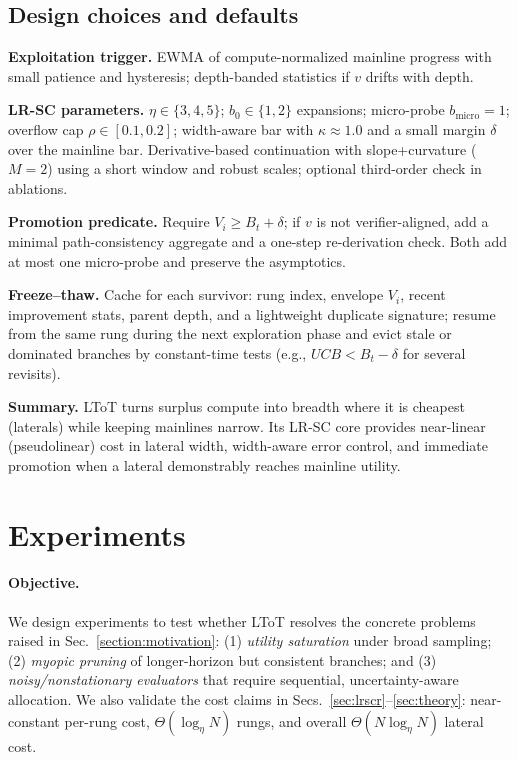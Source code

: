 \documentclass{article}
\begin{document}
\subsection{Design choices and defaults}
\label{sec:defaults}

\textbf{Exploitation trigger.}
EWMA of compute-normalized mainline progress with small patience and hysteresis; depth-banded statistics if $v$ drifts with depth.

\textbf{LR-SC parameters.}
$\eta\in\{3,4,5\}$; $b_0\in\{1,2\}$ expansions; micro-probe $b_{\text{micro}}=1$; overflow cap $\rho\in[0.1,0.2]$; width-aware bar with $\kappa\!\approx\!1.0$ and a small margin $\delta$ over the mainline bar.
Derivative-based continuation with slope+curvature ($M{=}2$) using a short window and robust scales; optional third-order check in ablations.

\textbf{Promotion predicate.}
Require $V_i \ge B_t + \delta$; if $v$ is not verifier-aligned, add a minimal path-consistency aggregate and a one-step re-derivation check.
Both add at most one micro-probe and preserve the asymptotics.

\textbf{Freeze--thaw.}
Cache for each survivor: rung index, envelope $V_i$, recent improvement stats, parent depth, and a lightweight duplicate signature; resume from the same rung during the next exploration phase and evict stale or dominated branches by constant-time tests (e.g., $UCB<B_t-\delta$ for several revisits).

\textbf{Summary.}
LToT turns surplus compute into breadth where it is cheapest (laterals) while keeping mainlines narrow.
Its LR-SC core provides near-linear (pseudolinear) cost in lateral width, width-aware error control, and immediate promotion when a lateral demonstrably reaches mainline utility.

\section{Experiments}
\label{section:experiments}

\paragraph{Objective.}
We design experiments to test whether LToT resolves the concrete problems raised in Sec.~\ref{section:motivation}:
(1) \emph{utility saturation} under broad sampling; (2) \emph{myopic pruning} of longer-horizon but consistent branches; and
(3) \emph{noisy/nonstationary evaluators} that require sequential, uncertainty-aware allocation.
We also validate the cost claims in Secs.~\ref{sec:lrscr}--\ref{sec:theory}:
near-constant per-rung cost, $\Theta(\log_\eta N)$ rungs, and overall $\Theta(N\log_\eta N)$ lateral cost.
\end{document}
